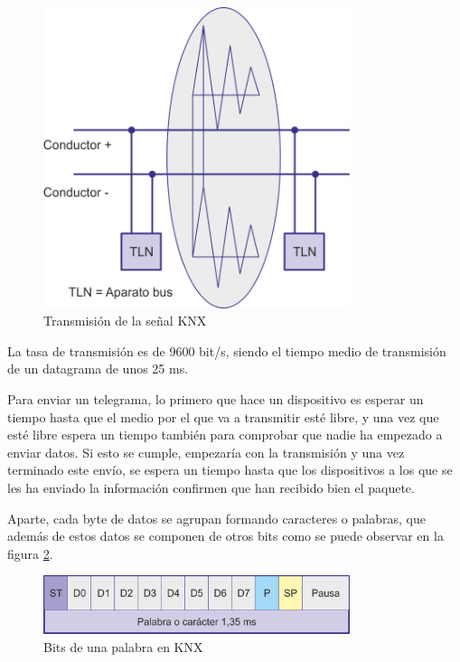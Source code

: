 \begin{figure}[ht]
	\centering
		\includegraphics[width=0.8\textwidth]{imagenes/topologia-knx.png}
	\caption{Transmisión de la señal KNX}
	\label{fig:transmisionknx}
\end{figure}



La tasa de transmisión es de 9600 bit/s, siendo el tiempo medio de transmisión de un datagrama de unos 25 ms.


Para enviar un telegrama, lo primero que hace un dispositivo es esperar un tiempo hasta que el medio por el que va a transmitir esté libre, y una vez que esté libre espera un tiempo también para comprobar que nadie ha empezado a enviar datos. Si esto se cumple, empezaría con la transmisión y una vez terminado este envío, se espera un tiempo hasta que los dispositivos a los que se les ha enviado la información confirmen que han recibido bien el paquete. 



Aparte, cada byte de datos se agrupan formando caracteres o palabras, que adem\'as de estos datos se componen de otros bits como se puede observar en la figura \ref{fig:palabra_knx}.
\begin{figure}[htbp]
	\centering
		\includegraphics[width=0.80\textwidth]{imagenes/palabra_knx.png}
	\caption{Bits de una palabra en KNX}
	\label{fig:palabra_knx}
\end{figure}


